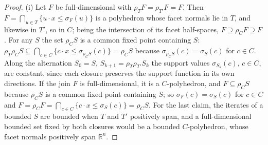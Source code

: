 \documentclass[11pt]{amsart}
\theoremstyle{definition}
\begin{document}
\begin{proof}
(i) Let $F$ be full-dimensional with $\rho_TF=\rho_{T'}F=F$. Then $F=
\bigcap_{u\in T}\{u\cdot x\le\sigma_F(u)\}$ is a polyhedron whose facet
normals lie in $T$, and likewise in $T'$, so in $C$; being the
intersection of its facet half-spaces, $F\supseteq\rho_CF\supseteq F$.
For any $S$ the set $\rho_CS$ is a common fixed point containing $S$:
$\rho_T\rho_CS\subseteq\bigcap_{c\in C}\{c\cdot x\le\sigma_{\rho_CS}(c)\}
=\rho_CS$ because $\sigma_{\rho_CS}(c)=\sigma_S(c)$ for $c\in C$. Along
the alternation $S_0=S$, $S_{k+1}=\rho_T\rho_{T'}S_k$ the support
values $\sigma_{S_k}(c)$, $c\in C$, are constant, since each closure
preserves the support function in its own directions. If the join $F$
is full-dimensional, it is a $C$-polyhedron, and $F\subseteq\rho_CS$
because $\rho_CS$ is a common fixed point containing $S$; so
$\sigma_F(c)=\sigma_S(c)$ for $c\in C$ and $F=\rho_CF=\bigcap_{c\in C}
\{c\cdot x\le\sigma_S(c)\}=\rho_CS$. For the last
claim, the iterates of a bounded $S$ are bounded when $T$ and $T'$
positively span, and a full-dimensional bounded set fixed by both
closures would be a bounded $C$-polyhedron, whose facet normals
positively span $\mathbb R^n$.


\end{proof}
\end{document}
